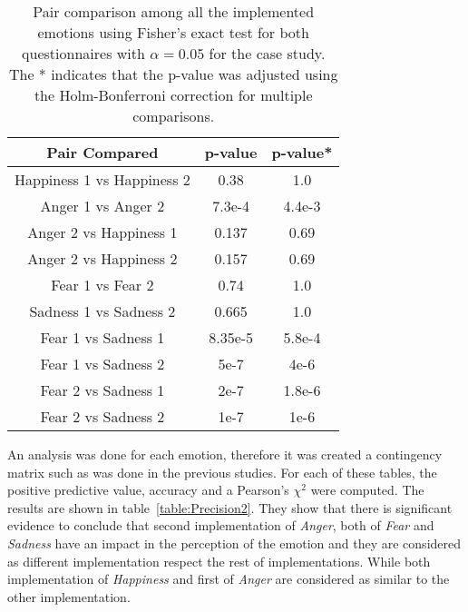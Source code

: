 \begin{table}[h]
\centering
\small
\caption{Pair comparison among all the implemented emotions using Fisher's exact test for both questionnaires with $\alpha = 0.05$ for the  case study. The * indicates that the p-value was adjusted using the Holm-Bonferroni correction for multiple comparisons.}
		\label{table:result_compare_fourth}
		\begin{tabular}{|c|c|c|}
			\hline	
\textbf{Pair Compared} & \textbf{p-value} & \textbf{p-value*}\\	
			\hline
			Happiness 1 vs Happiness 2 &0.38&1.0\\
			\hline
			Anger 1 vs Anger 2 & 7.3e-4&4.4e-3\\
			\hline
			Anger 2 vs Happiness 1 & 0.137&0.69\\
			\hline
			Anger 2 vs Happiness 2 & 0.157&0.69\\
			\hline
			Fear 1 vs Fear 2 & 0.74&1.0\\
			\hline
			Sadness 1 vs Sadness 2 & 0.665&1.0\\
			\hline
			Fear 1 vs Sadness 1& 8.35e-5&5.8e-4\\
			\hline
			Fear 1 vs Sadness 2 & 5e-7&4e-6\\
			\hline
			Fear 2 vs Sadness 1 & 2e-7&1.8e-6\\
			\hline
			Fear 2 vs Sadness 2 & 1e-7&1e-6\\
			\hline
			\end{tabular}
\end{table} 

An analysis was done for each emotion, therefore it was created a contingency matrix such as was done in the previous studies. For each of these tables, the positive predictive value, accuracy and a Pearson's $\chi^2$ were computed. The results are shown in table~\ref{table:Precision2}. They show that there is significant evidence to conclude that second implementation of \textit{Anger}, both of \textit{Fear} and \textit{Sadness} have an impact in the perception of the emotion and they are considered as different implementation respect the rest of implementations. While both implementation of \textit{Happiness} and first of \textit{Anger} are considered as similar to the other implementation.

